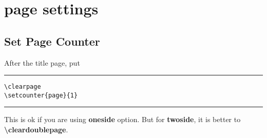 

\section{page settings}
\subsection{Set Page Counter}
After the title page, put

\noindent\vspace{1em}\hrule
\begin{verbatim}
\clearpage
\setcounter{page}{1}
\end{verbatim}
\noindent\hrule\vspace{1em}

This is ok if you are using \textbf{oneside} option. But for \textbf{twoside}, it is better to \textbf{\textbackslash cleardoublepage}.